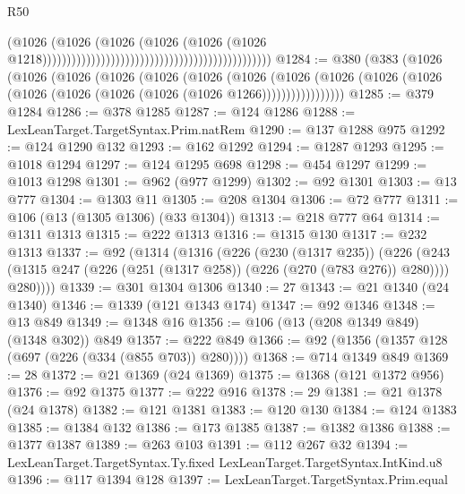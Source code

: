 \begin{lexlean}{R50}
\begin{coremodule}
{{{{{{{{{{{{{{{{{{{{{{{{{{{{{{{{{{{{{{{{{{{{{{{{{{{{{{{{{{{{                                                                                      (@1026
                                                                                        (@1026
                                                                                          (@1026
                                                                                            (@1026
                                                                                              (@1026
                                                                                                (@1026
                                                                                                  @1218)))))))))))))))))))))))))))))))))))))))))))))))
@1284 := @380
    (@383
      (@1026
        (@1026
          (@1026
            (@1026
              (@1026
                (@1026
                  (@1026
                    (@1026
                      (@1026 (@1026 (@1026 (@1026 (@1026 (@1026 (@1026 (@1026 @1266)))))))))))))))))
@1285 := @379 @1284
@1286 := @378 @1285
@1287 := @124 @1286
@1288 := LexLeanTarget.TargetSyntax.Prim.natRem
@1290 := @137 @1288 @975
@1292 := @124 @1290 @132
@1293 := @162 @1292
@1294 := @1287 @1293
@1295 := @1018 @1294
@1297 := @124 @1295 @698
@1298 := @454 @1297
@1299 := @1013 @1298
@1301 := @962 (@977 @1299)
@1302 := @92 @1301
@1303 := @13 @777
@1304 := @1303 @11
@1305 := @208 @1304
@1306 := @72 @777
@1311 := @106 (@13 (@1305 @1306) (@33 @1304))
@1313 := @218 @777 @64
@1314 := @1311 @1313
@1315 := @222 @1313
@1316 := @1315 @130
@1317 := @232 @1313
@1337 := @92
    (@1314
      (@1316
        (@226
          (@230 (@1317 @235))
          (@226
            (@243 (@1315 @247 (@226 (@251 (@1317 @258)) (@226 (@270 (@783 @276)) @280))))
            @280))))
@1339 := @301 @1304 @1306
@1340 := 27
@1343 := @21 @1340 (@24 @1340)
@1346 := @1339 (@121 @1343 @174)
@1347 := @92 @1346
@1348 := @13 @849
@1349 := @1348 @16
@1356 := @106 (@13 (@208 @1349 @849) (@1348 @302)) @849
@1357 := @222 @849
@1366 := @92 (@1356 (@1357 @128 (@697 (@226 (@334 (@855 @703)) @280))))
@1368 := @714 @1349 @849
@1369 := 28
@1372 := @21 @1369 (@24 @1369)
@1375 := @1368 (@121 @1372 @956)
@1376 := @92 @1375
@1377 := @222 @916
@1378 := 29
@1381 := @21 @1378 (@24 @1378)
@1382 := @121 @1381
@1383 := @120 @130
@1384 := @124 @1383
@1385 := @1384 @132
@1386 := @173 @1385
@1387 := @1382 @1386
@1388 := @1377 @1387
@1389 := @263 @103
@1391 := @112 @267 @32
@1394 := LexLeanTarget.TargetSyntax.Ty.fixed LexLeanTarget.TargetSyntax.IntKind.u8
@1396 := @117 @1394 @128
@1397 := LexLeanTarget.TargetSyntax.Prim.equal
}}}}}}}}}}}}}}}}}}}}}}}}}}}}}}}}}}}}}}}}}}}}}}}}}}}}}}}}}}}}
\end{coremodule}
\end{lexlean}
